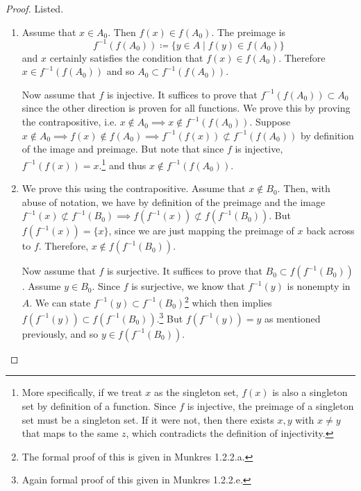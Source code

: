 \documentclass{article}
\begin{document}
    \begin{proof} 
      Listed. 
      \begin{enumerate}
        \item Assume that $x \in A_0$. Then $f(x) \in f(A_0)$. The preimage is 
        \begin{equation}
          f^{-1} (f(A_0)) \coloneqq \{ y \in A \mid f(y) \in f(A_0) \}
        \end{equation}
        and $x$ certainly satisfies the condition that $f(x) \in f(A_0)$. Therefore $x \in f^{-1} (f(A_0))$ and so $A_0 \subset f^{-1} (f(A_0))$. 

        Now assume that $f$ is injective. It suffices to prove that $f^{-1} (f(A_0)) \subset A_0$ since the other direction is proven for all functions. We prove this by proving the contrapositive, i.e. $x \not\in A_0 \implies x \not\in f^{-1} (f(A_0))$. Suppose $x \not\in A_0 \implies f(x) \not\in f(A_0) \implies f^{-1} (f(x)) \not\subset f^{-1} (f(A_0))$ by definition of the image and preimage. But note that since $f$ is injective, $f^{-1} (f(x)) = x$.\footnote{More specifically, if we treat $x$ as the singleton set, $f(x)$ is also a singleton set by definition of a function. Since $f$ is injective, the preimage of a singleton set must be a singleton set. If it were not, then there exists $x, y$ with $x \neq y$ that maps to the same $z$, which contradicts the definition of injectivity.} and thus $x \not\in f^{-1} (f(A_0))$. 

        \item We prove this using the contrapositive. Assume that $x \not\in B_0$. Then, with abuse of notation, we have by definition of the preimage and the image $f^{-1} (x) \not\subset f^{-1} (B_0) \implies f(f^{-1} (x)) \not\subset f(f^{-1}(B_0))$. But $f (f^{-1} (x)) = \{x\}$, since we are just mapping the preimage of $x$ back across to $f$. Therefore, $x \notin f( f^{-1} (B_0))$. 

        Now assume that $f$ is surjective. It suffices to prove that $B_0 \subset f (f^{-1}(B_0))$. Assume $y \in B_0$. Since $f$ is surjective, we know that $f^{-1} (y)$ is nonempty in $A$. We can state $f^{-1}(y) \subset f^{-1} (B_0)$\footnote{The formal proof of this is given in Munkres 1.2.2.a.} which then implies $f(f^{-1} (y)) \subset f (f^{-1} (B_0))$.\footnote{Again formal proof of this given in Munkres 1.2.2.e.} But $f (f^{-1} (y)) = y$ as mentioned previously, and so $y \in f(f^{-1} (B_0))$. 
      \end{enumerate}
    \end{proof}
\end{document}
